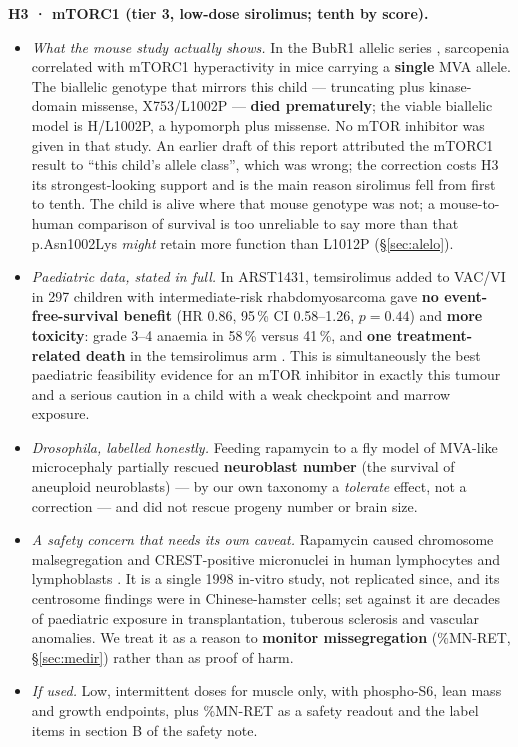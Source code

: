 \documentclass[10pt]{article}
\begin{document}
\textbf{H3 · mTORC1 (tier 3, low-dose sirolimus; tenth by score).}
\label{sec:h3}
\begin{itemize}
\item \textit{What the mouse study actually shows.} In the BubR1 allelic series \citep{sieben}, sarcopenia
  correlated with mTORC1 hyperactivity in mice carrying a \textbf{single} MVA allele. The biallelic genotype that
  mirrors this child --- truncating plus kinase-domain missense, X753/L1002P --- \textbf{died prematurely}; the
  viable biallelic model is H/L1002P, a hypomorph plus missense. No mTOR inhibitor was given in that study. An
  earlier draft of this report attributed the mTORC1 result to ``this child's allele class'', which was wrong; the
  correction costs H3 its strongest-looking support and is the main reason sirolimus fell from first to tenth. The child is alive where that mouse genotype was not; a
  mouse-to-human comparison of survival is too unreliable to say more than that p.Asn1002Lys \emph{might} retain
  more function than L1012P (§\ref{sec:alelo}).
\item \textit{Paediatric data, stated in full.} In ARST1431, temsirolimus added to VAC/VI in 297 children with
  intermediate-risk rhabdomyosarcoma gave \textbf{no event-free-survival benefit} (HR 0.86, 95\,\% CI 0.58--1.26,
  $p = 0.44$) and \textbf{more toxicity}: grade 3--4 anaemia in 58\,\% versus 41\,\%, and \textbf{one
  treatment-related death} in the temsirolimus arm \citep{gupta}. This is simultaneously the best paediatric
  feasibility evidence for an mTOR inhibitor in exactly this tumour and a serious caution in a child with a weak
  checkpoint and marrow exposure.
\item \textit{Drosophila, labelled honestly.} Feeding rapamycin to a fly model of MVA-like microcephaly partially
  rescued \textbf{neuroblast number} (the survival of aneuploid neuroblasts) \citep{milan} --- by our own taxonomy a \emph{tolerate}
  effect, not a correction --- and did not rescue progeny number or brain size.
\item \textit{A safety concern that needs its own caveat.} Rapamycin caused chromosome malsegregation and
  CREST-positive micronuclei in human lymphocytes and lymphoblasts \citep{bonatti}. It is a single 1998 in-vitro
  study, not replicated since, and its centrosome findings were in Chinese-hamster cells; set against it are
  decades of paediatric exposure in transplantation, tuberous sclerosis and vascular anomalies. We treat it as a
  reason to \textbf{monitor missegregation} (\%MN-RET, §\ref{sec:medir}) rather than as proof of harm.
\item \textit{If used.} Low, intermittent doses for muscle only, with phospho-S6, lean mass and growth endpoints,
  plus \%MN-RET as a safety readout and the label items in section B of the safety note.
\end{itemize}
\end{document}
